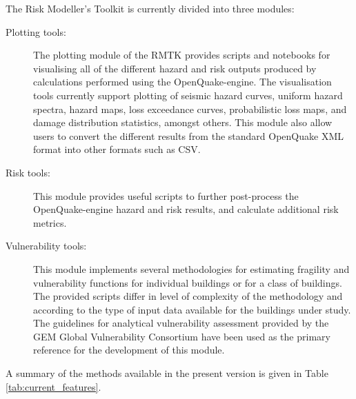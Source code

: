 The Risk Modeller's Toolkit is currently divided into three modules:
\begin{description}
\item[Plotting tools:] The plotting module of the RMTK provides scripts and notebooks for visualising all of the different hazard and risk outputs produced by calculations performed using the OpenQuake-engine. The visualisation tools currently support plotting of seismic hazard curves, uniform hazard spectra, hazard maps, loss exceedance curves, probabilistic loss maps, and damage distribution statistics, amongst others. This module also allow users to convert the different results from the standard OpenQuake XML format into other formats such as CSV.
\item[Risk tools:] This module provides useful scripts to further post-process the OpenQuake-engine hazard and risk results, and calculate additional risk metrics.
\item[Vulnerability tools:] This module implements several methodologies for estimating fragility and vulnerability functions for individual buildings or for a class of buildings. The provided scripts differ in level of complexity of the methodology and according to the type of input data available for the buildings under study. The guidelines for analytical vulnerability assessment provided by the GEM Global Vulnerability Consortium have been used as the primary reference for the development of this module.
\end{description}

A summary of the methods available in the present version is given in Table \ref{tab:current_features}.

